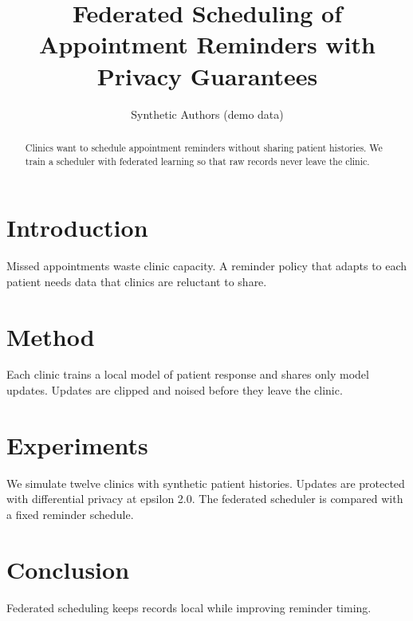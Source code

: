 \documentclass{article}
\title{Federated Scheduling of Appointment Reminders with Privacy Guarantees}
\author{Synthetic Authors (demo data)}
\begin{document}
\maketitle

\begin{abstract}
Clinics want to schedule appointment reminders without sharing patient histories. We train a scheduler with federated learning so that raw records never leave the clinic.
\end{abstract}

\section{Introduction}
Missed appointments waste clinic capacity. A reminder policy that adapts to each patient needs data that clinics are reluctant to share.

\section{Method}
Each clinic trains a local model of patient response and shares only model updates. Updates are clipped and noised before they leave the clinic.

\section{Experiments}
We simulate twelve clinics with synthetic patient histories. Updates are protected with differential privacy at epsilon 2.0. The federated scheduler is compared with a fixed reminder schedule.

\section{Conclusion}
Federated scheduling keeps records local while improving reminder timing.
\end{document}
